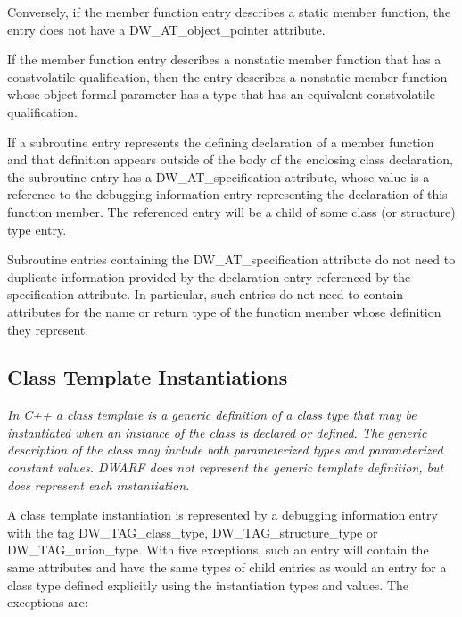 Conversely, if the member function entry describes a static
member function, the entry does not have a DW\_AT\_object\_pointer
attribute.

If the member function entry describes a non\dash static member
function that has a const\dash volatile qualification, then
the entry describes a non\dash static member function whose
object formal parameter has a type that has an equivalent
const\dash volatile qualification.

If a subroutine entry represents the defining declaration
of a member function and that definition appears outside of
the body of the enclosing class declaration, the subroutine
entry has a DW\_AT\_specification attribute, whose value is
a reference to the debugging information entry representing
the declaration of this function member. The referenced entry
will be a child of some class (or structure) type entry.

Subroutine entries containing the DW\_AT\_specification
attribute do not need to duplicate information provided
by the declaration entry referenced by the specification
attribute. In particular, such entries do not need to contain
attributes for the name or return type of the function member
whose definition they represent.

\subsection{Class Template Instantiations}
\label{chap:classtemplateinstantiations}

\textit{In C++ a class template is a generic definition of a class
type that may be instantiated when an instance of the class
is declared or defined. The generic description of the
class may include both parameterized types and parameterized
constant values. DWARF does not represent the generic template
definition, but does represent each instantiation.}

A class template instantiation is represented by a
debugging information entry with the tag DW\_TAG\_class\_type,
DW\_TAG\_structure\_type or DW\_TAG\_union\_type. With five
exceptions, such an entry will contain the same attributes
and have the same types of child entries as would an entry
for a class type defined explicitly using the instantiation
types and values. The exceptions are:

